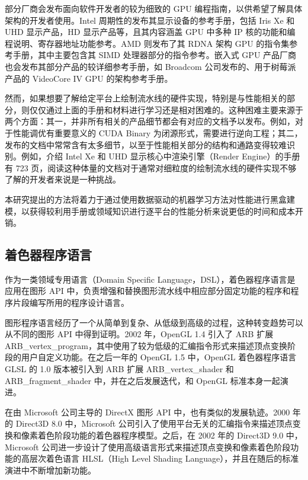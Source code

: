 
部分厂商会发布面向软件开发者的较为细致的 GPU 编程指南，以供希望了解具体架构的开发者使用。Intel 周期性的发布其显示设备的参考手册，包括 Iris Xe 和 UHD 显示产品，HD 显示产品等\cite{IntelGPUManual}，且其内容涵盖 GPU 中多种 IP 核的功能和编程说明、寄存器地址功能参考。AMD 则发布了其 RDNA 架构 GPU 的指令集参考手册\cite{AMDRDNAISA}，其中主要包含其 SIMD 处理器部分的指令参考。嵌入式 GPU 产品厂商也会发布其部分产品的较详细参考手册，如 Broadcom 公司发布的、用于树莓派产品的 VideoCore IV GPU 的架构参考手册\cite{V3DManual}。

然而，如果想要了解给定平台上绘制流水线的硬件实现，特别是与性能相关的部分，则仅仅通过上面的手册和材料进行学习还是相对困难的。这种困难主要来源于两个方面：其一，并非所有相关的产品细节都会有对应的文档予以发布。例如，对于性能调优有重要意义的 CUDA Binary 为闭源形式，需要进行逆向工程\cite{DecodingCUDABinary}；其二，发布的文档中常常含有太多细节，以至于性能相关部分的结构和通路变得较难识别。例如，介绍 Intel Xe 和 UHD 显示核心中渲染引擎（Render Engine）的手册有 723 页，阅读这种体量的文档对于通常对细粒度的绘制流水线的硬件实现不够了解的开发者来说是一种挑战。

本研究提出的方法将着力于通过使用数据驱动的机器学习方法对性能进行黑盒建模，以获得较利用手册或领域知识进行逐平台的性能分析来说更低的时间和成本开销。

\subsection{着色器程序语言}

作为一类领域专用语言（Domain Specific Language，DSL），着色器程序语言是应用在图形 API 中，负责增强和替换图形流水线中相应部分固定功能的程序和程序片段编写所用的程序设计语言。


图形程序语言经历了一个从简单到复杂、从低级到高级的过程，这种转变趋势可以从不同的图形 API 中得到证明。2002 年，OpenGL 1.4 引入了 ARB 扩展 ARB\_vertex\_program，其中使用了较为低级的汇编指令形式来描述顶点变换阶段的用户自定义功能。在之后一年的 OpenGL 1.5 中，OpenGL 着色器程序语言 GLSL 的 1.0 版本被引入到 ARB 扩展 ARB\_vertex\_shader 和 ARB\_fragment\_shader 中，并在之后发展迭代，和 OpenGL 标准本身一起演进。

在由 Microsoft 公司主导的 DirectX 图形 API 中，也有类似的发展轨迹。2000 年的 Direct3D 8.0 中，Microsoft 公司引入了使用平台无关的汇编指令来描述顶点变换和像素着色阶段功能的着色器程序模型。之后，在 2002 年的 Direct3D 9.0 中，Microsoft 公司进一步设计了使用高级语言形式来描述顶点变换和像素着色阶段功能的高层次着色语言 HLSL（High Level Shading Language），并且在随后的标准演进中不断增加新功能。

